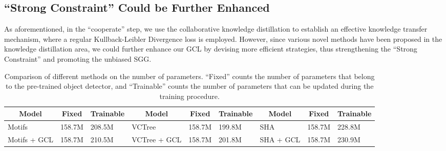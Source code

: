 \documentclass[10pt,twocolumn,letterpaper]{article}
\begin{document}
\subsection{``Strong Constraint'' Could be Further Enhanced}
As aforementioned, in the ``cooperate'' step, we use the collaborative knowledge distillation to establish an effective knowledge transfer mechanism, where a regular Kullback-Leibler Divergence loss is employed. However, since various novel methods have been proposed in the knowledge distillation area, we could further enhance our GCL by devising more efficient strategies, thus strengthening the ``Strong Constraint'' and promoting the unbiased SGG.

\begin{table*}[t]
	\small
	\begin{tabular}{p{2.0cm}<{\centering}p{1.1cm}<{\centering}p{1.1cm}<{\centering}|p{2.0cm}<{\centering}p{1.1cm}<{\centering}p{1.1cm}<{\centering}|p{2.0cm}<{\centering}|p{1.1cm}<{\centering}p{1.1cm}}
		\hline
		\multicolumn{1}{c}{Model}& \multicolumn{1}{c}{Fixed} & \multicolumn{1}{c|}{Trainable} & \multicolumn{1}{c}{Model} & \multicolumn{1}{c}{Fixed} & \multicolumn{1}{c|}{Trainable} & \multicolumn{1}{c}{Model} & \multicolumn{1}{c}{Fixed} & \multicolumn{1}{c}{Trainable}\\ \hline
		
		Motifs  & 158.7M & 208.5M & VCTree & 158.7M & 199.8M & SHA & 158.7M & 228.8M \\ 
		Motifs + GCL  & 158.7M & 210.5M & VCTree + GCL & 158.7M & 201.8M & SHA + GCL & 158.7M & 230.9M \\  \hline
		
	\end{tabular}
	\caption{Comparison of different methods on the number of parameters.       ``Fixed'' counts the number of parameters that belong to the pre-trained object detector, and ``Trainable'' counts the number of parameters that can be updated during the training procedure.}
	\label{para_counts}
	\vspace{0.1cm}
\end{table*}
\end{document}
